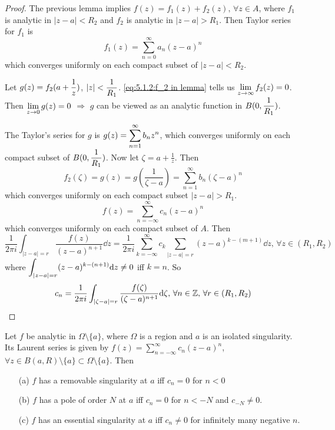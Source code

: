 \begin{proof}
    The previous lemma implies  $ f(z)=f_1(z)+f_2(z),\,\forall z\in A $, where  $ f_1  $ is analytic in  $ |z-a|<R_2 $ and  $ f_2  $ is analytic in  $ |z-a|>R_1 $. Then Taylor series for  $ f_1  $ is
    \begin{equation}
        f_1(z)=\sum_{n=0}^\infty a_n(z-a)^n
    \end{equation}
    which converges uniformly on each compact subset of  $ |z-a|<R_2 $.
    
    Let  $ g(z)=f_2(a+\displaystyle\frac{1}{z}) $,  $ |z|<\displaystyle\frac{1}{R_1} $. \eqref{eq:5.1.2:f_2 in lemma} tells us  $ \displaystyle\lim_{z\to\infty}f_2(z)=0 $. Then  $ \displaystyle\lim_{z\to 0}g(z)=0 $ $ \Rightarrow  $  $ g $ can be viewed as an analytic function in  $ B(0,\displaystyle\frac{1}{R_1}) $.

    The Taylor's series for  $ g  $ is  $ g(z)=\displaystyle\sum_{n=1}^\infty b_nz^n  $, which converges uniformly on each compact subset of  $ B(0,\displaystyle\frac{1}{R_1}) $. Now let  $ \zeta=a+\frac{1}{z} $. Then 
    \begin{equation}
        f_2(\zeta)=g(z)=g(\frac{1}{\zeta-a})=\sum_{n=1}^\infty b_n (\zeta-a)^n
    \end{equation} 
    which converges uniformly on each compact subset  $ |z-a|>R_1 $.  
    \begin{equation}
        f(z)=\sum_{n=-\infty}^\infty c_n(z-a)^n
    \end{equation}
    which converges uniformly on each compact subset of  $ A $. Then
    \begin{equation}
        \frac{1}{2\pi i}\int_{|z-a|=r}\frac{f(z)}{(z-a)^{n+1}}\dd z =\frac{1}{2\pi i}\sum_{k=-\infty}^\infty c_k\sum_{|z-a|=r}(z-a)^{k-(m+1)}\dd z,\,\forall z\in (R_1,R_2)
    \end{equation}
    where  $ \displaystyle\int_{|z-a|=r}(z-a)^{k-(n+1)}\mathrm{d} z\neq 0 $ iff  $ k=n $.  So 
    \begin{equation}
        c_n=\frac{1 }{2\pi i}\int_{|\zeta-a|=r}\frac{f(\zeta)}{(\zeta-a)^{n+1}}\mathrm{d}\zeta,\,\forall n\in \mathbb Z,\,\forall r\in (R_1,R_2)
    \end{equation}
\end{proof}
\begin{theorem}
    Let  $ f  $ be analytic in  $ \Omega\setminus\{a\} $, where  $ \Omega  $ is a region and  $ a  $ is an isolated singularity. Its Laurent series is given by  $ f(z)=\sum_{n=-\infty}^\infty c_n(z-a)^n $, $ \forall z\in B(a,R)\setminus\{a\}\subset \Omega\setminus\{a\} $. Then 
    \begin{enumerate}
        \item [(a)]  $ f  $ has a removable singularity at  $ a  $ iff  $ c_n =0 $ for  $ n<0 $   
        \item [(b)]  $ f  $ has a pole of order  $ N $ at  $ a $ iff  $ c_n=0 $ for  $ n<-N $ and  $ c_{-N}\neq 0 $.
        \item [(c)]  $ f  $ has an essential singularity at  $ a $ iff   $ c_n\neq 0 $ for infinitely many negative  $ n $.
    \end{enumerate}  
\end{theorem}
